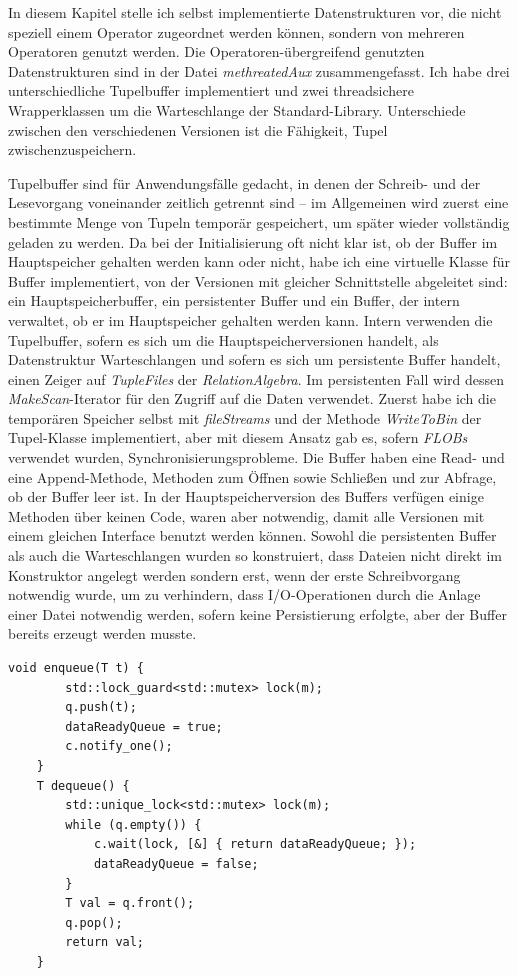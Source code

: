 \documentclass[a4paper,12pt,twoside]{article}
\newcommand{\Fb}[1]{\textit{#1}} %
\begin{document}
In diesem Kapitel stelle ich selbst implementierte Datenstrukturen vor, die nicht speziell einem Operator zugeordnet werden können, sondern von mehreren Operatoren genutzt werden. Die Operatoren-übergreifend genutzten Datenstrukturen sind in der Datei \Fb{methreatedAux} zusammengefasst. Ich habe drei unterschiedliche Tupelbuffer implementiert und zwei threadsichere Wrapperklassen um die Warteschlange der Standard-Library. Unterschiede zwischen den verschiedenen Versionen ist die Fähigkeit, Tupel zwischenzuspeichern.

Tupelbuffer sind für Anwendungsfälle gedacht, in denen der Schreib- und der Lesevorgang voneinander zeitlich getrennt sind -- im Allgemeinen wird zuerst eine bestimmte Menge von Tupeln temporär gespeichert, um später wieder vollständig geladen zu werden. Da bei der Initialisierung oft nicht klar ist, ob der Buffer im Hauptspeicher gehalten werden kann oder nicht, habe ich eine virtuelle Klasse für Buffer implementiert, von der Versionen mit gleicher Schnittstelle abgeleitet sind: ein Hauptspeicherbuffer, ein persistenter Buffer und ein Buffer, der intern verwaltet, ob er im Hauptspeicher gehalten werden kann. Intern verwenden die Tupelbuffer, sofern es sich um die Hauptspeicherversionen handelt, als Datenstruktur Warteschlangen und sofern es sich um persistente Buffer handelt, einen Zeiger auf \Fb{TupleFiles} der \Fb{RelationAlgebra}. Im persistenten Fall wird dessen \Fb{MakeScan}-Iterator für den Zugriff auf die Daten verwendet. Zuerst habe ich die temporären Speicher selbst mit \Fb{fileStreams} und der Methode \Fb{WriteToBin} der Tupel-Klasse implementiert, aber mit diesem Ansatz gab es, sofern \Fb{FLOBs} verwendet wurden, Synchronisierungsprobleme. Die Buffer haben eine Read- und eine Append-Methode, Methoden zum Öffnen sowie Schließen und zur Abfrage, ob der Buffer leer ist. In der Hauptspeicherversion des Buffers verfügen einige Methoden über keinen Code, waren aber notwendig, damit alle Versionen mit einem gleichen Interface benutzt werden können. Sowohl die persistenten Buffer als auch die Warteschlangen wurden so konstruiert, dass Dateien nicht direkt im Konstruktor angelegt werden sondern erst, wenn der erste Schreibvorgang notwendig wurde, um zu verhindern, dass I/O-Operationen durch die Anlage einer Datei notwendig werden, sofern keine Persistierung erfolgte, aber der Buffer bereits erzeugt werden musste.

\begin{minipage}{0.95\textwidth}
	\begin{lstlisting}[caption={Enqueue und Dequeue-Methode der threadsicheren Warteschlange.}, label=list:queue]
	void enqueue(T t) {
		std::lock_guard<std::mutex> lock(m);
		q.push(t);
		dataReadyQueue = true;
		c.notify_one();
	}
	T dequeue() {
		std::unique_lock<std::mutex> lock(m);
		while (q.empty()) {
			c.wait(lock, [&] { return dataReadyQueue; });
			dataReadyQueue = false;
		}
		T val = q.front();
		q.pop();
		return val;
	}
	\end{lstlisting}
\end{minipage}
\end{document}
